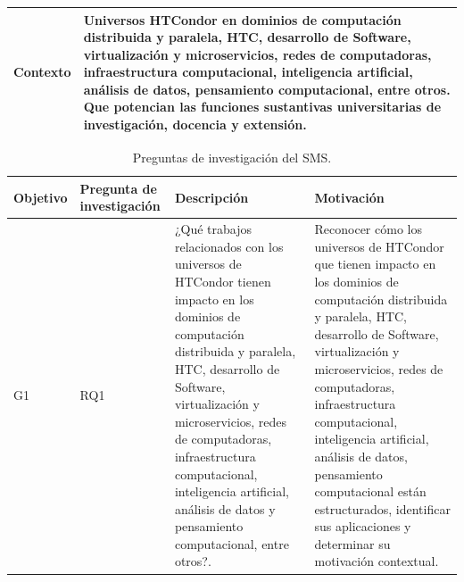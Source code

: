 \begin{table}[htbp]
\begin{tabular}{p{1.4cm}p{6.4cm}}
		\addlinespace[0.8em]
		\textbf{Contexto}     & Universos HTCondor en dominios de computación distribuida y paralela, HTC, desarrollo de Software, virtualización y microservicios, redes de computadoras, infraestructura computacional, inteligencia artificial, análisis de datos, pensamiento computacional, entre otros. Que potencian las funciones sustantivas universitarias de investigación, docencia y extensión.                                                                                                                     \\
		\bottomrule
	\end{tabular}
\end{table}

\begin{table}[htbp]
	\centering
	\caption{Preguntas de investigación del SMS.}
	\label{table:RQs}
	\renewcommand{\arraystretch}{1}  %
	\begin{tabular}{p{1cm}p{1.7cm}p{6.8cm}p{6.8cm}}
		\toprule
		\textbf{Objetivo} & \textbf{Pregunta de investigación} & \textbf{Descripción}                                                                                                                                                                                                                                                                                                                     & \textbf{Motivación}                                                                                                                                                                                                                                                                                                                                                                                    \\
		\midrule
		G1                & RQ1                                & ¿Qué trabajos relacionados con los universos de HTCondor tienen impacto en los dominios de computación distribuida y paralela, HTC, desarrollo de Software, virtualización y microservicios, redes de computadoras, infraestructura computacional, inteligencia artificial, análisis de datos y pensamiento computacional, entre otros?. & Reconocer cómo los universos de HTCondor que  tienen impacto en los dominios de computación distribuida y paralela, HTC, desarrollo de Software, virtualización y microservicios, redes de computadoras, infraestructura computacional, inteligencia artificial, análisis de datos, pensamiento computacional están estructurados, identificar sus aplicaciones y determinar su motivación contextual. \\

\end{tabular}
\end{table}
